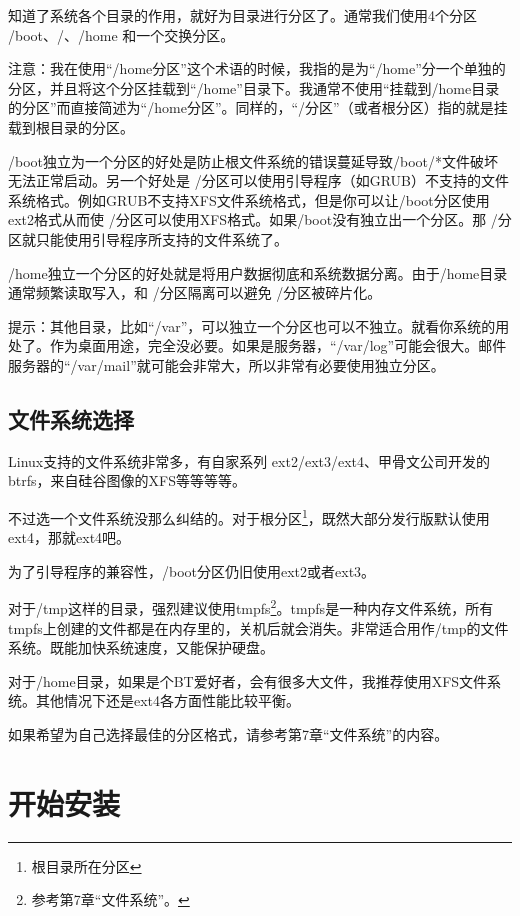 知道了系统各个目录的作用，就好为目录进行分区了。通常我们使用4个分区 /boot、/、/home 和一个交换分区。

\begin{notice}
注意：我在使用“/home分区”这个术语的时候，我指的是为“/home”分一个单独的分区，并且将这个分区挂载到“/home”目录下。我通常不使用“挂载到/home目录的分区”而直接简述为“/home分区”。同样的，“/分区”（或者根分区）指的就是挂载到根目录的分区。
\end{notice}

/boot独立为一个分区的好处是防止根文件系统的错误蔓延导致/boot/*文件破坏无法正常启动。另一个好处是 /分区可以使用引导程序（如GRUB）不支持的文件系统格式。例如GRUB不支持XFS文件系统格式，但是你可以让/boot分区使用ext2格式从而使 /分区可以使用XFS格式。如果/boot没有独立出一个分区。那 /分区就只能使用引导程序所支持的文件系统了。

/home独立一个分区的好处就是将用户数据彻底和系统数据分离。由于/home目录通常频繁读取写入，和 /分区隔离可以避免 /分区被碎片化。

提示：其他目录，比如“/var”，可以独立一个分区也可以不独立。就看你系统的用处了。作为桌面用途，完全没必要。如果是服务器，“/var/log”可能会很大。邮件服务器的“/var/mail”就可能会非常大，所以非常有必要使用独立分区。

\subsection{文件系统选择}


Linux支持的文件系统非常多，有自家系列 ext2/ext3/ext4、甲骨文公司开发的btrfs，来自硅谷图像的XFS等等等等。

不过选一个文件系统没那么纠结的。对于根分区\footnote{根目录所在分区}，既然大部分发行版默认使用ext4，那就ext4吧。

为了引导程序的兼容性，/boot分区仍旧使用ext2或者ext3。

对于/tmp这样的目录，强烈建议使用tmpfs\footnote{参考第7章“文件系统”。}。tmpfs是一种内存文件系统，所有tmpfs上创建的文件都是在内存里的，关机后就会消失。非常适合用作/tmp的文件系统。既能加快系统速度，又能保护硬盘。

对于/home目录，如果是个BT爱好者，会有很多大文件，我推荐使用XFS文件系统。其他情况下还是ext4各方面性能比较平衡。

如果希望为自己选择最佳的分区格式，请参考第7章“文件系统”的内容。

\section{开始安装}

